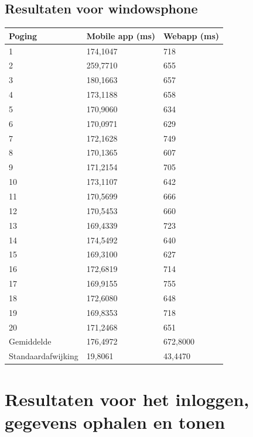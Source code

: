 \documentclass[pdftex,a4paper,12pt,twoside]{report}
\begin{document}
\subsection{Resultaten voor windowsphone}
\begin{center}
    \begin{tabular}{ | l | l | l |}
    \hline
    Poging & Mobile app (ms) & Webapp (ms)
      \\ \hline
      1 & 174,1047 & 718
      \\ \hline
      2 & 259,7710 & 655
      \\ \hline
      3 & 180,1663 & 657
      \\ \hline
      4 & 173,1188 & 658
      \\ \hline
      5 & 170,9060 & 634
      \\ \hline
      6 & 170,0971 & 629
      \\ \hline
      7 & 172,1628 & 749
      \\ \hline
      8 & 170,1365 & 607
      \\ \hline
      9 & 171,2154 & 705
      \\ \hline
      10 & 173,1107 & 642
      \\ \hline
      11 & 170,5699 & 666
      \\ \hline
      12 & 170,5453 & 660
      \\ \hline
      13 & 169,4339 & 723
      \\ \hline
      14 & 174,5492 & 640
      \\ \hline
      15 & 169,3100 & 627
      \\ \hline
      16 & 172,6819 & 714
      \\ \hline
      17 & 169,9155 & 755
      \\ \hline
      18 & 172,6080 & 648
      \\ \hline
      19 & 169,8353 & 718
      \\ \hline
      20 & 171,2468 & 651
      \\ \hline
      Gemiddelde & 176,4972 & 672,8000
      \\ \hline
      Standaardafwijking & 19,8061 & 43,4470
      \\ \hline
    \end{tabular}
\end{center}
\newpage
\section{Resultaten voor het inloggen, gegevens ophalen en tonen}
\end{document}
